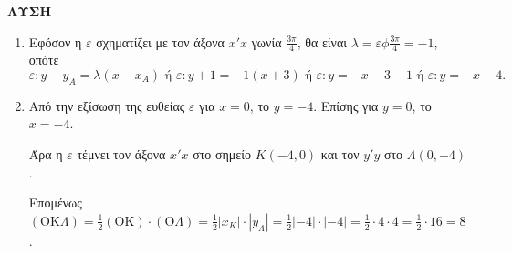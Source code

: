 \noindent \textbf{ΛΥΣΗ}
\begin{enumerate}[\textalpha)]
    \item Εφόσον η $\varepsilon$ σχηματίζει με τον άξονα $x'x$ γωνία $\frac{3\pi}{4}$, θα είναι $\lambda = \varepsilon\phi\frac{3\pi}{4} = -1$, οπότε
    \[\varepsilon: y - y_A = \lambda(x - x_A) \text{ ή } \varepsilon: y + 1 = -1 (x + 3) \text{ ή } \varepsilon: y = -x - 3 - 1 \text{ ή } \varepsilon: y = -x - 4.\]
    \item Από την εξίσωση της ευθείας $\varepsilon$ για $x = 0$, το $y = -4$. Επίσης για $y = 0$, το $x = -4$.
    
    Άρα η $\varepsilon$ τέμνει τον άξονα $x'x$ στο σημείο $K(-4, 0)$ και τον $y'y$ στο $\Lambda(0, -4)$.
    
    Επομένως $(\text{OK}\Lambda) = \frac{1}{2} (\text{OK})\cdot(\text{O}\Lambda) = \frac{1}{2} |x_K|\cdot|y_\Lambda| = \frac{1}{2} |-4|\cdot|-4| = \frac{1}{2} \cdot 4\cdot 4 = \frac{1}{2}\cdot 16 = 8$.
\end{enumerate}
\endlysh{}